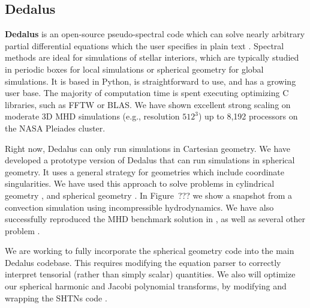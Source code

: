 {\color{purple}    
\subsection{Dedalus}}

\textbf{Dedalus} is an open-source pseudo-spectral code which can solve nearly arbitrary partial differential equations which the user specifies in plain text \citep[][source code at: dedalus-project.org]{Burns2016}. Spectral methods are ideal for simulations of stellar interiors, which are typically studied in periodic boxes for local simulations or spherical geometry for global simulations. It is based in Python, is straightforward to use, and has a growing user base. The majority of computation time is spent executing optimizing C libraries, such as FFTW or BLAS. We have shown excellent strong scaling on moderate 3D MHD simulations (e.g., resolution $512^3$) up to 8,192 processors on the NASA Pleiades cluster.

Right now, Dedalus can only run simulations in Cartesian geometry. We have developed a prototype version of Dedalus that can run simulations in spherical geometry. It uses a general strategy for geometries which include coordinate singularities. We have used this approach to solve problems in cylindrical geometry \cite{Vasil_2016}, and spherical geometry \citep[][submitted to JCP]{p}. In Figure~??? we show a snapshot from a convection simulation using incompressible hydrodynamics. We have also successfully reproduced the MHD benchmark solution in \cite{Marti_2014}, as well as several other problem \citep[][submitted to JCP]{s}.

We are working to fully incorporate the spherical geometry code into the main Dedalus codebase. This requires modifying the equation parser to correctly interpret tensorial (rather than simply scalar) quantities. We also will optimize our spherical harmonic and Jacobi polynomial transforms, by modifying and wrapping the SHTNs code \cite{Schaeffer_2013}.
